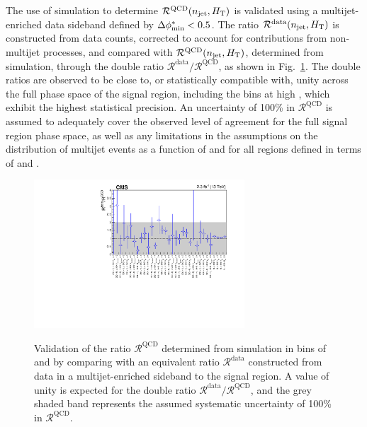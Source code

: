 The use of simulation to determine $\mathcal{R}^\text{QCD}(n_{\text{jet}},
H_{\mathrm{T}})$ is validated using a multijet-enriched data sideband defined
by $\mbox{$\Delta\phi^{*}_{\rm min}$} < 0.5$.
The ratio $\mathcal{R}^\text{data}(n_{\text{jet}}, H_{\mathrm{T}})$ is constructed
from data counts, corrected to account for contributions from
non-multijet processes, and compared with
$\mathcal{R}^\text{QCD}(n_{\text{jet}}, H_{\mathrm{T}})$, determined from simulation,
through the double ratio
$\mathcal{R}^\text{data}/\mathcal{R}^\text{QCD}$, as shown in
Fig.~\ref{fig:qcd}. The double ratios are observed to be close to, or
statistically compatible with, unity across the full phase space of
the signal region, including the bins at high \scalht, which exhibit
the highest statistical precision. An uncertainty of 100\% in
$\mathcal{R}^\text{QCD}$ is assumed to adequately cover the observed
level of agreement for the full signal region phase space, as well as
any limitations in the assumptions on the distribution of multijet
events as a function of \nb and \HTmiss for all regions defined in
terms of \njet and \scalht.

\begin{figure}[!t]
  \begin{center}
    \includegraphics[width=0.7\textwidth]{figures/qcd/v1/DoubleRatioQCD_noEmpty} \\
  \end{center}
  \caption{Validation of the ratio $\mathcal{R}^\text{QCD}$ determined
    from simulation in bins of \njet and \scalht by comparing with an
    equivalent ratio $\mathcal{R}^\text{data}$ constructed from data 
    in a multijet-enriched sideband to the signal region. A value of
    unity is expected for the double ratio $\mathcal{R}^\text{data} /
    \mathcal{R}^\text{QCD}$, and the grey shaded band represents the
    assumed systematic uncertainty of 100\% in
    $\mathcal{R}^\text{QCD}$. 
  }
  \label{fig:qcd} 
\end{figure}

